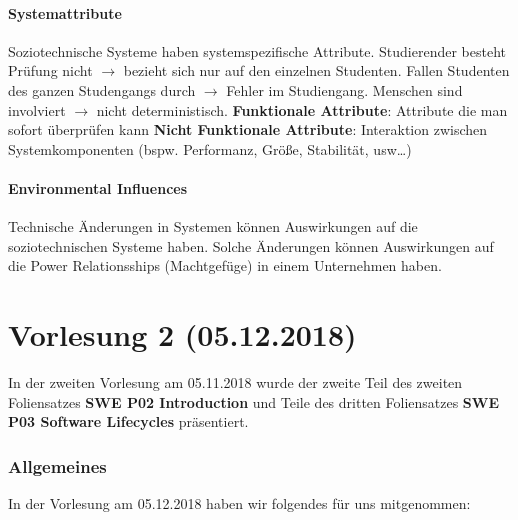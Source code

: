 \documentclass[a4paper,12pt,twoside]{scrreprt}
\begin{document}
\subsubsection{Systemattribute}
Soziotechnische Systeme haben systemspezifische Attribute. \newline
Studierender besteht Prüfung nicht $\rightarrow$ bezieht sich nur auf den einzelnen Studenten.\newline
Fallen Studenten des ganzen Studengangs durch $\rightarrow$ Fehler im Studiengang.\newline
Menschen sind involviert $\rightarrow$ nicht deterministisch.\newline
\newline
\textbf{Funktionale Attribute}: Attribute die man sofort überprüfen kann
\newline
\textbf{Nicht Funktionale Attribute}: Interaktion zwischen Systemkomponenten (bspw. Performanz, Größe, Stabilität, usw…)

\subsubsection{Environmental Influences}
Technische Änderungen in Systemen können Auswirkungen auf die soziotechnischen Systeme haben. 
\newline
Solche Änderungen können Auswirkungen auf die Power Relationsships (Machtgefüge) in einem Unternehmen haben.


\chapter{Vorlesung 2 (05.12.2018)}
In der zweiten Vorlesung am 05.11.2018 wurde der zweite Teil des zweiten Foliensatzes \textbf{SWE P02 Introduction} und Teile des dritten Foliensatzes \textbf{SWE P03 Software Lifecycles} präsentiert. 

\subsection{Allgemeines}
In der Vorlesung am 05.12.2018 haben wir folgendes für uns mitgenommen:
\end{document}
